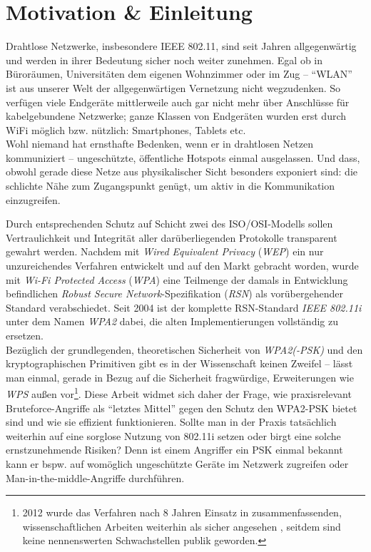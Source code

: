 \section{Motivation \& Einleitung}
Drahtlose Netzwerke, insbesondere IEEE 802.11, sind seit Jahren allgegenwärtig und werden in ihrer Bedeutung sicher noch weiter zunehmen. Egal ob in Büroräumen, Universitäten dem eigenen Wohnzimmer oder im Zug -- \enquote{WLAN} ist aus unserer Welt der allgegenwärtigen Vernetzung nicht wegzudenken. 
So verfügen viele Endgeräte mittlerweile auch gar nicht mehr über Anschlüsse für kabelgebundene Netzwerke; ganze Klassen von Endgeräten wurden erst durch WiFi möglich bzw. nützlich: Smartphones, Tablets etc.\\

Wohl niemand hat ernsthafte Bedenken, wenn er in drahtlosen Netzen kommuniziert -- ungeschützte, öffentliche Hotspots einmal ausgelassen. 
Und dass, obwohl gerade diese Netze aus physikalischer Sicht besonders exponiert sind: die schlichte Nähe zum Zugangspunkt genügt, um aktiv in die Kommunikation einzugreifen.

Durch entsprechenden Schutz auf Schicht zwei des ISO/OSI-Modells sollen Vertraulichkeit und Integrität aller darüberliegenden Protokolle transparent gewahrt werden.
Nachdem mit \textit{Wired Equivalent Privacy} (\textit{WEP}) ein nur unzureichendes Verfahren entwickelt und auf den Markt gebracht worden, wurde mit \textit{Wi-Fi Protected Access} (\textit{WPA}) eine Teilmenge der damals in Entwicklung befindlichen \textit{Robust Secure Network}-Spezifikation (\textit{RSN}) als vorübergehender Standard verabschiedet.
Seit 2004 ist der komplette RSN-Standard \textit{IEEE 802.11i} unter dem Namen \textit{WPA2} dabei, die alten Implementierungen vollständig zu ersetzen.\\

Bezüglich der grundlegenden, theoretischen Sicherheit von \textit{WPA2(-PSK)} und den kryptographischen Primitiven gibt es in der Wissenschaft keinen Zweifel -- lässt man einmal, gerade in Bezug auf die Sicherheit fragwürdige, Erweiterungen wie \textit{WPS} außen vor\footnote{2012 wurde das Verfahren nach 8 Jahren Einsatz in zusammenfassenden, wissenschaftlichen Arbeiten weiterhin als sicher angesehen \cite{kumkar2012}, seitdem sind keine nennenswerten Schwachstellen publik geworden.}.
Diese Arbeit widmet sich daher der Frage, wie praxisrelevant Bruteforce-Angriffe als \enquote{letztes Mittel} gegen den Schutz den WPA2-PSK bietet sind und wie sie effizient funktionieren.
Sollte man in der Praxis tatsächlich weiterhin auf eine sorglose Nutzung von 802.11i setzen oder birgt eine solche ernstzunehmende Risiken? Denn ist einem Angriffer ein PSK einmal bekannt kann er bspw. auf womöglich ungeschützte Geräte im Netzwerk zugreifen oder Man-in-the-middle-Angriffe durchführen.\\

